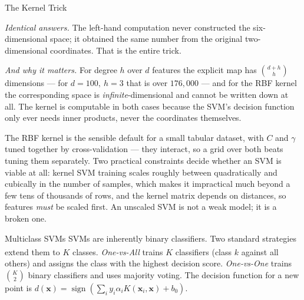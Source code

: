 \begin{v3topic}{The Kernel Trick}
\begin{workedexample}
\emph{Identical answers.} The left-hand computation never constructed the
six-dimensional space; it obtained the same number from the original
two-dimensional coordinates. That is the entire trick.

\emph{And why it matters.} For degree $h$ over $d$ features the explicit map has
$\binom{d+h}{h}$ dimensions --- for $d=100,\ h=3$ that is over $176{,}000$ --- and
for the RBF kernel the corresponding space is \emph{infinite}-dimensional and
cannot be written down at all. The kernel is computable in both cases because
the SVM's decision function only ever needs inner products, never the
coordinates themselves.
\end{workedexample}


\begin{engineernote}
The RBF kernel is the sensible default for a small tabular dataset, with $C$
and $\gamma$ tuned together by cross-validation --- they interact, so a grid
over both beats tuning them separately. Two practical constraints decide
whether an SVM is viable at all: kernel SVM training scales roughly between
quadratically and cubically in the number of samples, which makes it
impractical much beyond a few tens of thousands of rows, and the kernel matrix
depends on distances, so features \emph{must} be scaled first. An unscaled SVM
is not a weak model; it is a broken one.
\end{engineernote}

\end{v3topic}
\begin{v3topic}{Multiclass SVMs}
    SVMs are inherently binary classifiers. Two standard strategies extend them to $K$ classes\textsuperscript{\cite[][pp.~413--415]{hanDataMiningConcepts2012}}. \emph{One-vs-All} trains $K$ classifiers (class $k$ against all others) and assigns the class with the highest decision score. \emph{One-vs-One} trains $\binom{K}{2}$ binary classifiers and uses majority voting. The decision function for a new point is $d(\mathbf{x}) = \operatorname{sign}\!\left(\sum_{i} y_i \alpha_i K(\mathbf{x}_i, \mathbf{x}) + b_0\right)$.
\end{v3topic}

